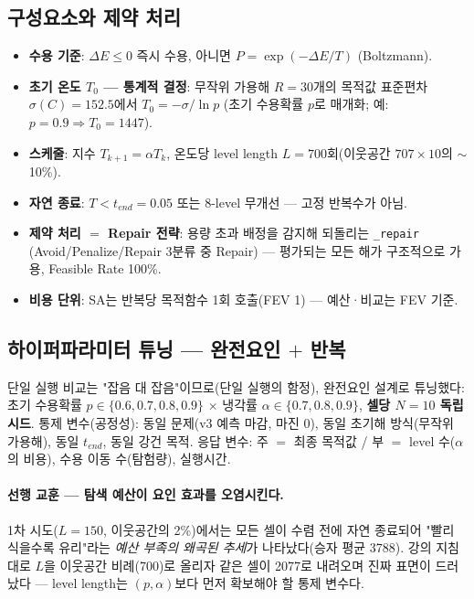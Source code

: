 \documentclass[11pt]{article}
\begin{document}
\subsection{구성요소와 제약 처리}

\begin{itemize}[nosep]
  \item \textbf{수용 기준}: $\Delta E \le 0$ 즉시 수용, 아니면 $P=\exp(-\Delta E/T)$ (Boltzmann).
  \item \textbf{초기 온도 $T_0$ — 통계적 결정}: 무작위 가용해 $R{=}30$개의 목적값 표준편차 $\sigma(C){=}152.5$에서
        $T_0=-\sigma/\ln p$ (초기 수용확률 $p$로 매개화; 예: $p{=}0.9 \Rightarrow T_0{=}1447$).
  \item \textbf{스케줄}: 지수 $T_{k+1}=\alpha T_k$, 온도당 level length $L{=}700$회(이웃공간 $707{\times}10$의 $\sim$10\%).
  \item \textbf{자연 종료}: $T<t_{end}{=}0.05$ 또는 8-level 무개선 — 고정 반복수가 아님.
  \item \textbf{제약 처리 $=$ Repair 전략}: 용량 초과 배정을 감지해 되돌리는 \texttt{\_repair}
        (Avoid/Penalize/Repair 3분류 중 Repair) — 평가되는 모든 해가 구조적으로 가용, Feasible Rate 100\%.
  \item \textbf{비용 단위}: SA는 반복당 목적함수 1회 호출(FEV 1) — 예산·비교는 FEV 기준.
\end{itemize}

\subsection{하이퍼파라미터 튜닝 — 완전요인 $+$ 반복}

단일 실행 비교는 "잡음 대 잡음"이므로(단일 실행의 함정), 완전요인 설계로 튜닝했다:
초기 수용확률 $p\in\{0.6,0.7,0.8,0.9\}$ $\times$ 냉각률 $\alpha\in\{0.7,0.8,0.9\}$, \textbf{셀당 $N{=}10$ 독립 시드}.
통제 변수(공정성): 동일 문제(v3 예측 마감, 마진 0), 동일 초기해 방식(무작위 가용해), 동일 $t_{end}$, 동일 강건 목적.
응답 변수: 주 $=$ 최종 목적값 / 부 $=$ level 수($\alpha$의 비용), 수용 이동 수(탐험량), 실행시간.

\paragraph{선행 교훈 — 탐색 예산이 요인 효과를 오염시킨다.}
1차 시도($L{=}150$, 이웃공간의 2\%)에서는 모든 셀이 수렴 전에 자연 종료되어
"빨리 식을수록 유리"라는 \emph{예산 부족의 왜곡된 추세}가 나타났다(승자 평균 3788).
강의 지침대로 $L$을 이웃공간 비례(700)로 올리자 같은 셀이 2077로 내려오며 진짜 표면이 드러났다 —
level length는 $(p,\alpha)$보다 먼저 확보해야 할 통제 변수다.
\end{document}

